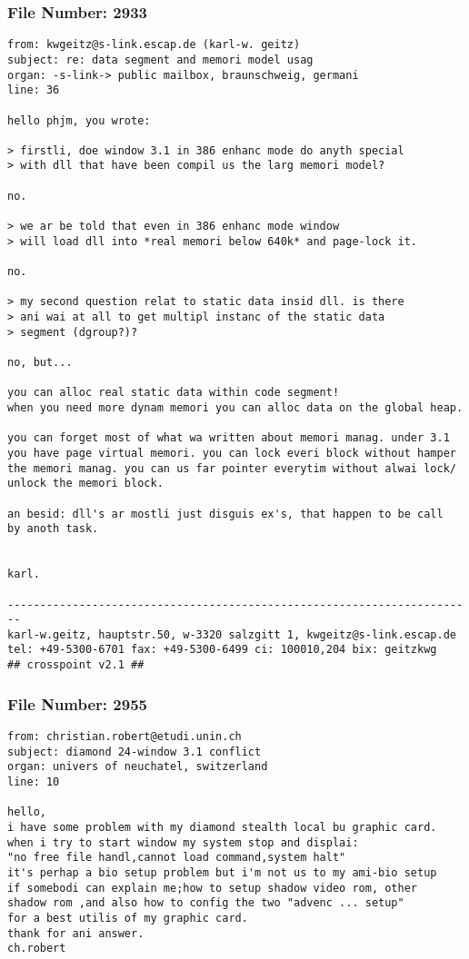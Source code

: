 \subsubsection*{File Number: 2933}
\scriptsize\begin{verbatim}
from: kwgeitz@s-link.escap.de (karl-w. geitz)
subject: re: data segment and memori model usag
organ: -s-link-> public mailbox, braunschweig, germani
line: 36

hello phjm, you wrote:

> firstli, doe window 3.1 in 386 enhanc mode do anyth special
> with dll that have been compil us the larg memori model?

no.

> we ar be told that even in 386 enhanc mode window
> will load dll into *real memori below 640k* and page-lock it.

no.

> my second question relat to static data insid dll. is there
> ani wai at all to get multipl instanc of the static data
> segment (dgroup?)?

no, but...

you can alloc real static data within code segment!
when you need more dynam memori you can alloc data on the global heap.

you can forget most of what wa written about memori manag. under 3.1
you have page virtual memori. you can lock everi block without hamper
the memori manag. you can us far pointer everytim without alwai lock/
unlock the memori block.

an besid: dll's ar mostli just disguis ex's, that happen to be call
by anoth task.


karl.

------------------------------------------------------------------------
karl-w.geitz, hauptstr.50, w-3320 salzgitt 1, kwgeitz@s-link.escap.de
tel: +49-5300-6701 fax: +49-5300-6499 ci: 100010,204 bix: geitzkwg
## crosspoint v2.1 ##
\end{verbatim}
\subsubsection*{File Number: 2955}
\scriptsize\begin{verbatim}
from: christian.robert@etudi.unin.ch
subject: diamond 24-window 3.1 conflict
organ: univers of neuchatel, switzerland
line: 10

hello,
i have some problem with my diamond stealth local bu graphic card.
when i try to start window my system stop and displai:
"no free file handl,cannot load command,system halt"
it's perhap a bio setup problem but i'm not us to my ami-bio setup
if somebodi can explain me;how to setup shadow video rom, other 
shadow rom ,and also how to config the two "advenc ... setup"
for a best utilis of my graphic card.
thank for ani answer.
ch.robert
\end{verbatim}
